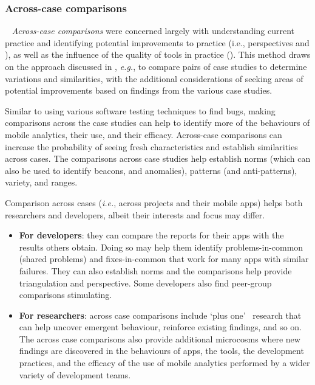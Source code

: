 \subsubsection{Across-case comparisons}~\label{across-case-comparisons-research-method}
\textit{Across-case comparisons} were concerned largely with understanding current practice and identifying potential improvements to practice (i.e., perspectives \uuse and \iuse), as well as the influence of the quality of tools in practice (\itools). This method draws on the approach discussed in , \textit{e.g.}, to compare pairs of case studies to determine variations and similarities, with the additional considerations of seeking areas of potential improvements based on findings from the various case studies.

Similar to using various software testing techniques to find bugs, making comparisons across the case studies can help to identify more of the behaviours of mobile analytics, their use, and their efficacy. Across-case comparisons can increase the probability of seeing fresh characteristics and establish similarities across cases. The comparisons across case studies help establish norms (which can also be used to identify beacons, and anomalies), patterns (and anti-patterns), variety, and ranges. 

Comparison across cases (\textit{i.e.}, across projects and their mobile apps) helps both researchers and developers, albeit their interests and focus may differ.

\begin{itemize}
    \item \textbf{For developers}: they can compare the reports for their apps with the results others obtain. Doing so may help them identify problems-in-common (shared problems) and fixes-in-common that work for many apps with similar failures. They can also establish norms and the comparisons help provide triangulation and perspective. Some developers also find peer-group comparisons stimulating.
    
    \item \textbf{For researchers}: across case comparisons include `plus one'~ research that can help uncover emergent behaviour, reinforce existing findings, and so on. The across case comparisons also provide additional microcosms where new findings are discovered in the behaviours of apps, the tools, the development practices, and the efficacy of the use of mobile analytics performed by a wider variety of development teams.
\end{itemize}


